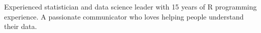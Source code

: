 
\begin{cvskills}

  \cvskill
    {} %
    {Experienced statistician and data science leader with 15 years of R programming experience. A passionate communicator who loves helping people understand their data.
} %



\end{cvskills}
